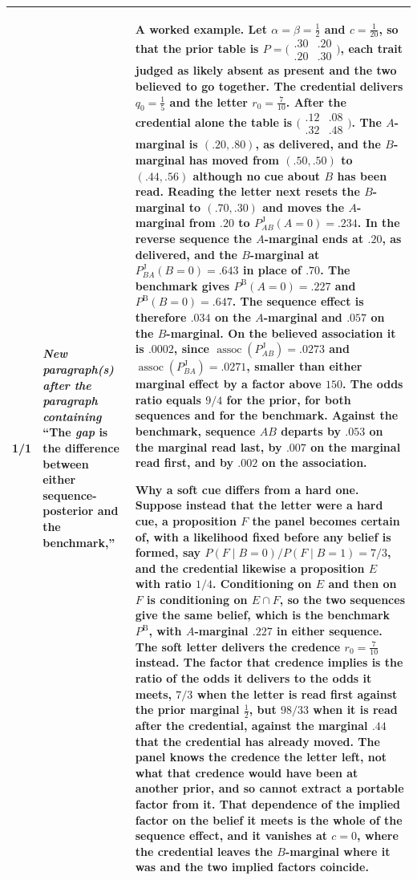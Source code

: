 \documentclass[10pt]{article}
\theoremstyle{definition}
\newcommand{\PB}{P^{\mathrm{B}}}
\newcommand{\PJ}{P^{\mathrm{J}}}
\newcommand{\assoc}{\operatorname{assoc}}
\begin{document}
{\begin{longtable}{|p{0.9cm}|p{12.2cm}|p{12.2cm}|}
1/1 & \textit{New paragraph(s) after the paragraph containing} ``The \emph{gap} is the difference between either sequence-posterior and the benchmark,'' & \textbf{A worked example.}  Let $\alpha=\beta=\tfrac12$ and $c=\tfrac1{20}$, so that the prior table is $P=\bigl(\begin{smallmatrix}.30&.20\\.20&.30\end{smallmatrix}\bigr)$, each trait judged as likely absent as present and the two believed to go together. The credential delivers $q_0=\tfrac15$ and the letter $r_0=\tfrac7{10}$. After the credential alone the table is $\bigl(\begin{smallmatrix}.12&.08\\.32&.48\end{smallmatrix}\bigr)$. The $A$-marginal is $(.20,.80)$, as delivered, and the $B$-marginal has moved from $(.50,.50)$ to $(.44,.56)$ although no cue about $B$ has been read. Reading the letter next resets the $B$-marginal to $(.70,.30)$ and moves the $A$-marginal from $.20$ to $\PJ_{AB}(A{=}0)=.234$. In the reverse sequence the $A$-marginal ends at $.20$, as delivered, and the $B$-marginal at $\PJ_{BA}(B{=}0)=.643$ in place of $.70$. The benchmark gives $\PB(A{=}0)=.227$ and $\PB(B{=}0)=.647$. The sequence effect is therefore $.034$ on the $A$-marginal and $.057$ on the $B$-marginal. On the believed association it is $.0002$, since $\assoc(\PJ_{AB})=.0273$ and $\assoc(\PJ_{BA})=.0271$, smaller than either marginal effect by a factor above $150$. The odds ratio equals $9/4$ for the prior, for both sequences and for the benchmark. Against the benchmark, sequence $AB$ departs by $.053$ on the marginal read last, by $.007$ on the marginal read first, and by $.002$ on the association. \par \textbf{Why a soft cue differs from a hard one.}  Suppose instead that the letter were a hard cue, a proposition $F$ the panel becomes certain of, with a likelihood fixed before any belief is formed, say $P(F\mid B{=}0)/P(F\mid B{=}1)=7/3$, and the credential likewise a proposition $E$ with ratio $1/4$. Conditioning on $E$ and then on $F$ is conditioning on $E\cap F$, so the two sequences give the same belief, which is the benchmark $\PB$, with $A$-marginal $.227$ in either sequence. The soft letter delivers the credence $r_0=\tfrac7{10}$ instead. The factor that credence implies is the ratio of the odds it delivers to the odds it meets, $7/3$ when the letter is read first against the prior marginal $\tfrac12$, but $98/33$ when it is read after the credential, against the marginal $.44$ that the credential has already moved. The panel knows the credence the letter left, not what that credence would have been at another prior, and so cannot extract a portable factor from it. That dependence of the implied factor on the belief it meets is the whole of the sequence effect, and it vanishes at $c=0$, where the credential leaves the $B$-marginal where it was and the two implied factors coincide. \\ \hline

\end{longtable}}
\end{document}
